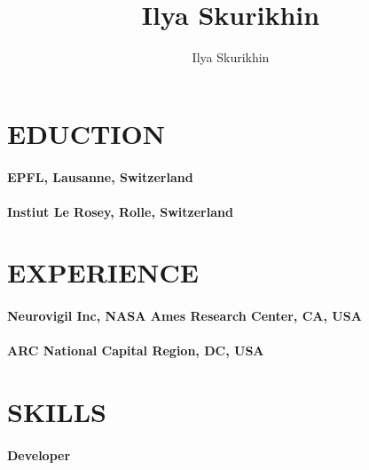 \documentclass[12pt,a4paper]{res}
\author{Ilya Skurikhin}
\title{Ilya Skurikhin}
\begin{document}
\section{EDUCTION}

\paragraph{EPFL, Lausanne, Switzerland}

\paragraph{Instiut Le Rosey, Rolle, Switzerland}

\section{EXPERIENCE}

\paragraph{Neurovigil Inc, NASA Ames Research Center, CA, USA}

\paragraph{ARC National Capital Region, DC, USA}

\section{SKILLS}

\paragraph{Developer}
\end{document}
